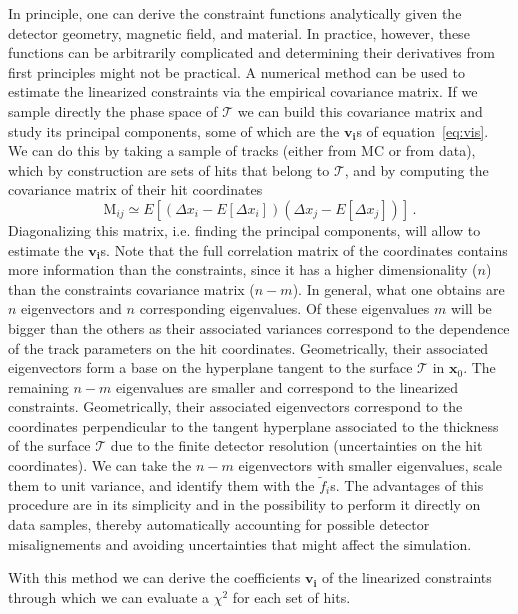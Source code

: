 \documentclass[10pt,a4paper]{article}
\newcommand{\bfx}{\mathbf{x}}
\begin{document}
In principle, one can derive the constraint functions analytically given the detector geometry, magnetic field, and material. In practice, however, these functions can be arbitrarily complicated and determining their derivatives from first principles might not be practical. A numerical method can be used to estimate the linearized constraints via the empirical covariance matrix. If we sample directly the phase space of $\mathcal{T}$ we can build this covariance matrix and study its principal components, some of which are the $\mathbf{v_i}$s of equation~\ref{eq:vis}. We can do this by taking a sample of tracks (either from MC or from data), which by construction are sets of hits that belong to $\mathcal{T}$, and by computing the covariance matrix of their hit coordinates
\begin{equation}
\mbox{M}_{ij} \simeq E[ (\Delta x_i - E[\Delta x_i])(\Delta x_j - E[\Delta x_j])]\, .
\end{equation}
Diagonalizing this matrix, i.e. finding the principal components, will allow to estimate the $\mathbf{v_i}$s. Note that the full correlation matrix of the coordinates contains more information than the constraints, since it has a higher dimensionality ($n$) than the constraints covariance matrix ($n - m$). In general, what one obtains are $n$ eigenvectors and $n$ corresponding eigenvalues. Of these eigenvalues $m$ will be bigger than the others as their associated variances correspond to the dependence of the track parameters on the hit coordinates. Geometrically, their associated eigenvectors form a base on the hyperplane tangent to the surface $\mathcal{T}$ in $\bfx_0$. The remaining $n - m$ eigenvalues are smaller and correspond to the linearized constraints. Geometrically, their associated eigenvectors correspond to the coordinates perpendicular to the tangent hyperplane associated to the thickness of the surface $\mathcal{T}$ due to the finite detector resolution (uncertainties on the hit coordinates). We can take the $n - m$ eigenvectors with smaller eigenvalues, scale them to unit variance, and identify them with the $\tilde{f}_i$s. The advantages of this procedure are in its simplicity and in the possibility to perform it directly on data samples, thereby automatically accounting for possible detector misalignements and avoiding uncertainties that might affect the simulation.

With this method we can derive the coefficients $\mathbf{v_i}$ of the linearized constraints through which we can evaluate a $\chi^2$ for each set of hits.
\end{document}
